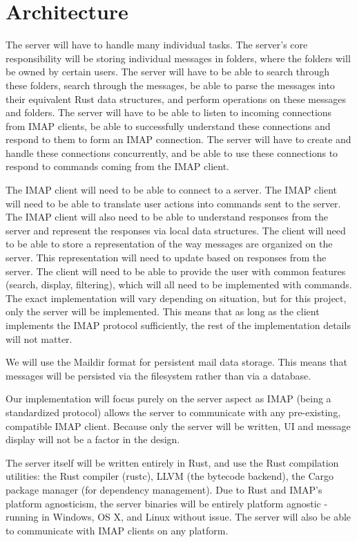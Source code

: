 \documentclass[a4paper,12pt]{article}
\begin{document}
\section*{Architecture}

The server will have to handle many individual tasks.
The server's core responsibility will be storing individual messages in folders, where the folders will be owned by certain users.
The server will have to be able to search through these folders, search through the messages, be able to parse the messages into their equivalent Rust data structures, and perform operations on these messages and folders.
The server will have to be able to listen to incoming connections from IMAP clients, be able to successfully understand these connections and respond to them to form an IMAP connection.
The server will have to create and handle these connections concurrently, and be able to use these connections to respond to commands coming from the IMAP client.

The IMAP client will need to be able to connect to a server.
The IMAP client will need to be able to translate user actions into commands sent to the server.
The IMAP client will also need to be able to understand responses from the server and represent the responses via local data structures.
The client will need to be able to store a representation of the way messages are organized on the server.
This representation will need to update based on responses from the server.
The client will need to be able to provide the user with common features (search, display, filtering), which will all need to be implemented with commands.
The exact implementation will vary depending on situation, but for this project, only the server will be implemented.
This means that as long as the client implements the IMAP protocol sufficiently, the rest of the implementation details will not matter.

We will use the Maildir format for persistent mail data storage. This means that messages will be persisted via the filesystem rather than via a database.

Our implementation will focus purely on the server aspect as IMAP (being a standardized protocol) allows the server to communicate with any pre-existing, compatible IMAP client. Because only the server will be written, UI and message display will not be a factor in the design.

The server itself will be written entirely in Rust, and use the Rust compilation utilities: the Rust compiler (rustc), LLVM (the bytecode backend), the Cargo package manager (for dependency management). Due to Rust and IMAP's platform agnosticism, the server binaries will be entirely platform agnostic - running in Windows, OS X, and Linux without issue. The server will also be able to communicate with IMAP clients on any platform.
\end{document}
